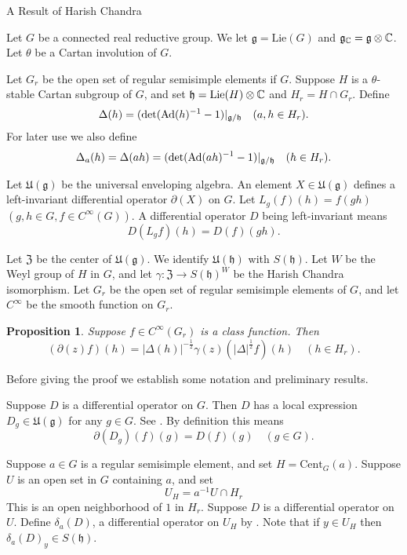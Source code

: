 \documentclass{article}
\newtheorem{pro}[thm]{Proposition}
\theoremstyle{definition}
\numberwithin{equation}{section}
\renewcommand{\-}{\hyp{}}
\newcommand{\inv}{^{-1}}
\newcommand{\z}{\mathfrak Z}
\newcommand{\U}{\mathfrak U}
\newcommand{\g}{\mathfrak g}
\newcommand{\h}{\mathfrak h}
\newcommand{\Cent}{\mathrm{Cent}}
\begin{document}
\begin{mytitle} A Result of Harish Chandra\end{mytitle}


Let $G$ be
 a connected real reductive group.
We let $\g=\mathrm{Lie}(G)$ and $\g_\C=\g\otimes\C$.
Let $\theta$ be a Cartan involution of $G$.

Let $G_r$ be the open set of regular semisimple elements if $G$. Suppose $H$ is a $\theta$-stable Cartan subgroup of $G$, and set $\h=\mathrm{Lie}(H)\otimes\C$ and 
$H_r=H\cap G_r$.
Define
$$
\Delta(h)=(\det(\Ad(h)\inv -1)|_{\g/\h}\quad (a,h\in H_r).
$$
For later use we also define
$$
\Delta_a(h)=\Delta(ah)=(\det(\Ad(ah)\inv -1)|_{\g/\h}\quad (h\in H_r).
$$

Let $\U(\g)$ be the universal enveloping algebra. 
An element $X\in \U(\g)$ defines a left-invariant differential operator $\partial(X)$ on $G$. 
Let $L_g(f)(h)=f(gh)$ $(g,h\in G,f\in C^\infty(G))$. A differential operator $D$ being left-invariant means 
\begin{equation}
\label{e:left}
D(L_gf)(h)=D(f)(gh).
\end{equation}

Let $\z$ be the center of  $\U(\g)$.
We identify $\U(\h)$ with $S(\h)$. 
Let $W$ be the Weyl group of $H$ in $G$, and 
let $\gamma:\z\rightarrow S(\h)^W$ be the Harish Chandra isomorphism.
Let $G_r$ be the open set of regular semisimple elements of $G$, and let $C^\infty$ be the smooth function on $G_r$. 


\begin{pro}
Suppose $f\in C^\infty(G_r)$ is a class function. Then
$$
(\partial(z)f)(h)=|\Delta(h)|^{-\frac12}\gamma(z)(|\Delta|^{\frac12}f)(h)\quad (h\in H_r).
$$
\end{pro}

Before giving the proof we establish some notation and preliminary results.



Suppose $D$ is a differential operator on $G$. Then $D$ has a local expression $D_g\in\U(\g)$ for any $g\in G$.
See \cite[Section 4]{HC_characters}.
By definition this means
\begin{equation}
\label{e:partial}
\partial(D_g)(f)(g)=D(f)(g)\quad (g\in G).
\end{equation}

Suppose $a\in G$ is a regular semisimple element, and set $H=\Cent_G(a)$. Suppose $U$ is an open set in $G$ containing $a$, 
and set
$$
U_H=a\inv U\cap H_r
$$
This is an open neighborhood of $1$ in $H_r$.
Suppose $D$ is a differential operator on $U$. Define $\delta_a(D)$, a differential operator  on $U_H$ by \cite[Section 4]{HC_inv_eigen}.
Note that if $y\in U_H$ then $\delta_a(D)_y\in S(\h)$. 
\end{document}
